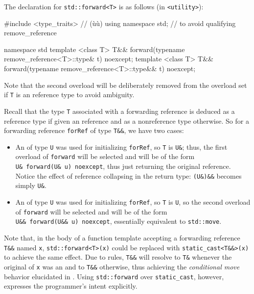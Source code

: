 The declaration for \lstinline!std::forward<T>! is as follows (in
\lstinline!<utility>!):

\begin{emcppshiddenlisting}[emcppsbatch=e7]
#include <type_traits>  // (ù{}ù)
using namespace std; // to avoid qualifying remove_reference
\end{emcppshiddenlisting}
\begin{emcppslisting}[emcppsbatch=e7]
namespace std {
template <class T> T&& forward(typename remove_reference<T>::type&  t) noexcept; 
template <class T> T&& forward(typename remove_reference<T>::type&& t) noexcept; 
}
\end{emcppslisting}

\noindent Note that the second overload will be deliberately removed from the overload set if \lstinline!T! is an  reference type to avoid ambiguity.


Recall that the type \lstinline!T! associated with a forwarding reference
is deduced as a reference type if given an  reference and
as a nonreference type otherwise. So for a forwarding reference
\lstinline!forRef! of type \lstinline!T&&!, we have two cases:
\begin{itemize}
\item{An  of type \lstinline!U! was used for initializing \lstinline!forRef!, so \lstinline!T! is \lstinline!U&!; thus, the first overload of \lstinline!forward! will be selected and will be of the form \lstinline!U&!~\lstinline!forward(U&!~\lstinline!u)!~\lstinline!noexcept!, thus just returning the original  reference. Notice the effect of reference collapsing in the return type: \lstinline!(U&)&&! becomes simply \lstinline!U&!.}
\item{An  of type \lstinline!U! was used for initializing \lstinline!forRef!, so \lstinline!T! is \lstinline!U!, so the second overload of \lstinline!forward! will be selected and will be of the form \lstinline!U&&!~\lstinline!forward(U&&!~\lstinline!u)!~\lstinline!noexcept!, essentially equivalent to \lstinline!std::move!.}
\end{itemize}
Note that, in the body of a function template accepting a forwarding
reference \lstinline!T&&! named \lstinline!x!, \lstinline!std::forward<T>(x)!
could be replaced with \lstinline!static_cast<T&&>(x)! to achieve the
same effect. Due to  rules, \lstinline!T&&!
will resolve to \lstinline!T&! whenever the original  of \lstinline!x! was an  and to \lstinline!T&&!
otherwise, thus achieving the \emph{conditional move} behavior
elucidated in .
Using \lstinline!std::forward! over \lstinline!static_cast!, however, expresses the programmer's intent explicitly.

